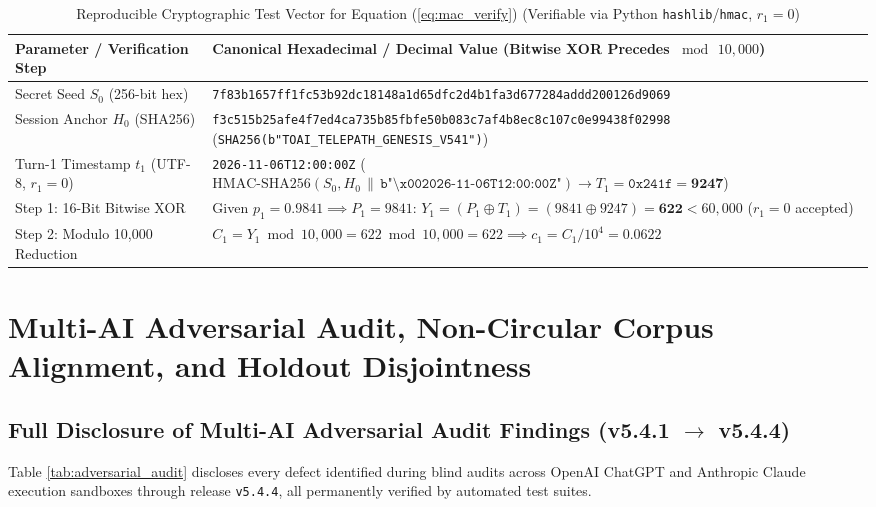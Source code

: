 \documentclass[9pt,a4paper]{extarticle}
\begin{document}
\begin{table}[h!]
\centering
\caption{Reproducible Cryptographic Test Vector for Equation (\ref{eq:mac_verify}) (Verifiable via Python \texttt{hashlib}/\texttt{hmac}, $r_1 = 0$)}
\label{tab:crypto_vector}
\footnotesize
\renewcommand{\arraystretch}{0.98}
\setlength{\tabcolsep}{2.5pt}
\begin{tabularx}{\textwidth}{L{3.7cm} Y}
\toprule
{}
\textbf{\color{white}Parameter / Verification Step} &
\textbf{\color{white}Canonical Hexadecimal / Decimal Value (Bitwise XOR Precedes $\bmod\, 10{,}000$)} \\
\midrule
Secret Seed $S_0$ (256-bit hex) & \texttt{7f83b1657ff1fc53b92dc18148a1d65dfc2d4b1fa3d677284addd200126d9069} \\
Session Anchor $H_0$ (SHA256) & \texttt{f3c515b25afe4f7ed4ca735b85fbfe50b083c7af4b8ec8c107c0e99438f02998} (\texttt{SHA256(b"TOAI\_TELEPATH\_GENESIS\_V541")}) \\
Turn-1 Timestamp $t_1$ (UTF-8, $r_1=0$) & \texttt{2026-11-06T12:00:00Z} ($\text{HMAC-SHA256}(S_0, H_0 \,\|\, \texttt{b"\textbackslash x002026-11-06T12:00:00Z"}) \rightarrow T_1 = \texttt{0x241f} = \mathbf{9247}$) \\
Step 1: 16-Bit Bitwise XOR & Given $p_1 = 0.9841 \implies P_1 = 9841$: $Y_1 = (P_1 \oplus T_1) = (9841 \oplus 9247) = \mathbf{622} < 60{,}000$ ($r_1 = 0$ accepted) \\
Step 2: Modulo 10,000 Reduction & $C_1 = Y_1 \bmod 10{,}000 = 622 \bmod 10{,}000 = 622 \implies c_1 = C_1 / 10^4 = \mathbf{0.0622}$ \\
\bottomrule
\end{tabularx}
\end{table}

\section{Multi-AI Adversarial Audit, Non-Circular Corpus Alignment, and Holdout Disjointness}
\subsection{Full Disclosure of Multi-AI Adversarial Audit Findings (v5.4.1 $\rightarrow$ v5.4.4)}
Table \ref{tab:adversarial_audit} discloses every defect identified during blind audits across OpenAI ChatGPT and Anthropic Claude execution sandboxes through release \texttt{v5.4.4}, all permanently verified by automated test suites.
\end{document}
